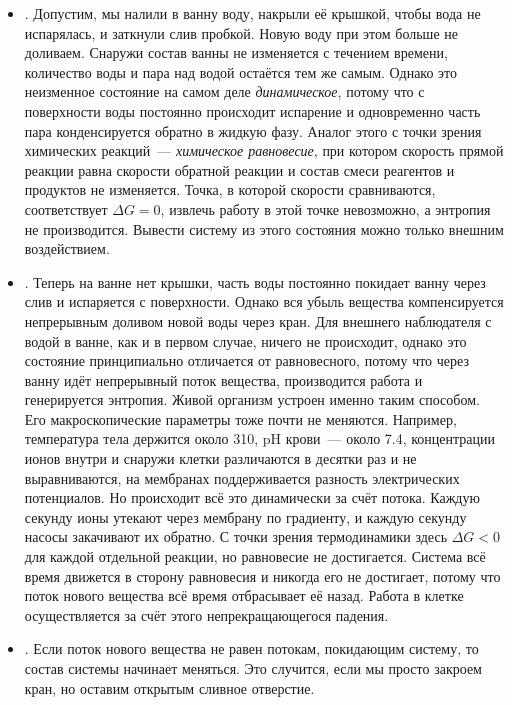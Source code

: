 \begin{itemize}
    \item {}. Допустим, мы налили в ванну воду, накрыли её крышкой, чтобы вода не испарялась, и заткнули слив пробкой. Новую воду при этом больше не доливаем. Снаружи состав ванны не изменяется с течением времени, количество воды и пара над водой остаётся тем же самым. Однако это неизменное состояние на самом деле \emph{динамическое}, потому что с поверхности воды постоянно происходит испарение и одновременно часть пара конденсируется обратно в жидкую фазу. Аналог этого с точки зрения химических реакций~--- \emph{химическое равновесие}, при котором скорость прямой реакции равна скорости обратной реакции и состав смеси реагентов и продуктов не изменяется. Точка, в которой скорости сравниваются, соответствует $\Delta G = 0$, извлечь работу в этой точке невозможно, а энтропия не производится. Вывести систему из этого состояния можно только внешним воздействием.
    \item {}. Теперь на ванне нет крышки, часть воды постоянно покидает ванну через слив и испаряется с поверхности. Однако вся убыль вещества компенсируется непрерывным доливом новой воды через кран. Для внешнего наблюдателя с водой в ванне, как и в первом случае, ничего не происходит, однако это состояние принципиально отличается от равновесного, потому что через ванну идёт непрерывный поток вещества, производится работа и генерируется энтропия. Живой организм устроен именно таким способом. Его макроскопические параметры тоже почти не меняются. Например, температура тела держится около \qty{310}{\ruK}, pH крови~--- около \num{7,4}, концентрации ионов внутри и снаружи клетки различаются в десятки раз и не выравниваются, на мембранах поддерживается разность электрических потенциалов. Но происходит всё это динамически за счёт потока. Каждую секунду ионы утекают через мембрану по градиенту, и каждую секунду насосы закачивают их обратно. С точки зрения термодинамики здесь $\Delta G < 0$ для каждой отдельной реакции, но равновесие не достигается. Система всё время движется в сторону равновесия и никогда его не достигает, потому что поток нового вещества всё время отбрасывает её назад. Работа в клетке осуществляется за счёт этого непрекращающегося падения.
    \item {}. Если поток нового вещества не равен потокам, покидающим систему, то состав системы начинает меняться. Это случится, если мы просто закроем кран, но оставим открытым сливное отверстие.
\end{itemize}

